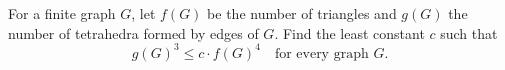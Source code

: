 For a finite graph $G$, let $f(G)$ be the number of triangles and $g(G)$ the number of tetrahedra formed by edges of $G$. Find the least constant $c$ such that
\[ g(G)^3 \leq c \cdot f(G)^4 \quad \text{for every graph } G. \]
